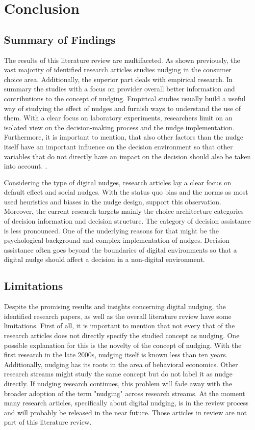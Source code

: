 \section{Conclusion}

 \subsection{Summary of Findings}
The results of this literature review are multifaceted. As shown previously, the vast majority of identified research articles studies nudging in the consumer choice area. Additionally, the superior part deals with empirical research. In summary the studies with a focus on provider overall better information and contributions to the concept of nudging. Empirical studies usually build a useful way of studying the effect of nudges and furnish ways to understand the use of them. With a clear focus on laboratory experiments, researchers limit on an isolated view on the decision-making process and the nudge implementation. Furthermore, it is important to mention, that also other factors than the nudge itself have an important influence on the decision environment so that other variables that do not directly have an impact on the decision should also be taken into account. \cite{dong_cueing_2019}.

Considering the type of digital nudges, research articles lay a clear focus on default effect and social nudges. With the status quo bias and the norms as most used heuristics and biases in the nudge design, support this observation. Moreover, the current research targets mainly the choice architecture categories of decision information and decision structure. The category of decision assistance is less pronounced. One of the underlying reasons for that might be the psychological background and complex implementation of nudges. Decision assistance often goes beyond the boundaries of digital environments so that a digital nudge should affect a decision in a non-digital environment. 
 
 \subsection{Limitations}
Despite the promising results and insights concerning digital nudging, the identified research papers, as well as the overall literature review have some limitations.
First of all, it is important to mention that not every that of the research articles does not directly specify the studied concept as nudging. One possible explanation for this is the novelty of the concept of nudging. With the first research in the late 2000s, nudging itself is known less than ten years. Additionally, nudging has its roots in the area of behavioral economics. Other research streams might study the same concept but do not label it as nudge directly. If nudging research continues, this problem will fade away with the broader adoption of the term "nudging" across research streams. At the moment many research articles, specifically about digital nudging, is in the review process and will probably be released in the near future. Those articles in review are not part of this literature review. 

